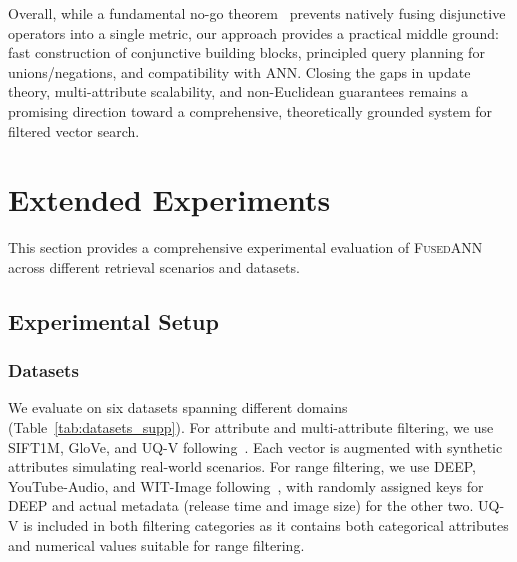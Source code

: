 \documentclass[numbers,sort]{article}
\begin{document}
\noindent Overall, while a fundamental no-go theorem~\citep{burago2001course} prevents natively fusing disjunctive operators into a single metric, our approach provides a practical middle ground: fast construction of conjunctive building blocks, principled query planning for unions/negations, and compatibility with ANN. Closing the gaps in update theory, multi-attribute scalability, and non-Euclidean guarantees remains a promising direction toward a comprehensive, theoretically grounded system for filtered vector search.




\section{Extended Experiments}
\label{sec:ext_exp}

This section provides a comprehensive experimental evaluation of \textsc{FusedANN} across different retrieval scenarios and datasets.

\subsection{Experimental Setup}
\label{sec:exp-setup}

\subsubsection{Datasets}

We evaluate on six datasets spanning different domains (Table~\ref{tab:datasets_supp}). For attribute and multi-attribute filtering, we use SIFT1M, GloVe, and UQ-V following~\cite{wang2023efficient}. Each vector is augmented with synthetic attributes simulating real-world scenarios. For range filtering, we use DEEP, YouTube-Audio, and WIT-Image following~\cite{zuo2024serf}, with randomly assigned keys for DEEP and actual metadata (release time and image size) for the other two. UQ-V is included in both filtering categories as it contains both categorical attributes and numerical values suitable for range filtering.
\end{document}

